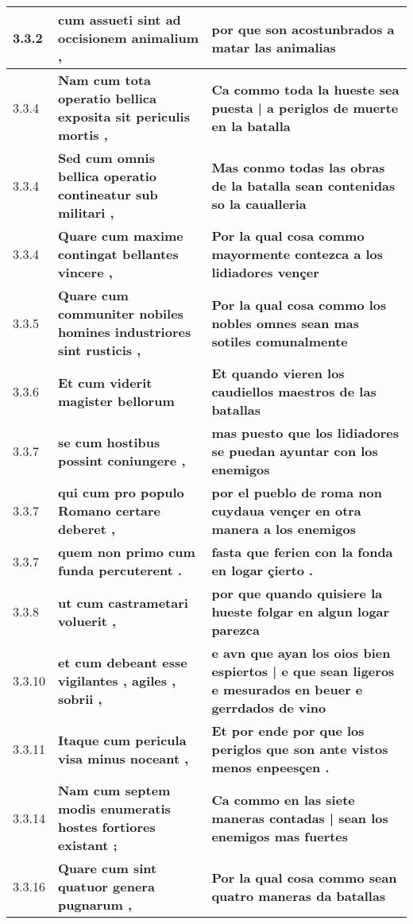 \begin{tabular}{|p{1cm}|p{6.5cm}|p{6.5cm}|}
3.3.2 &  \textbf{ cum assueti sint ad occisionem animalium , }  &  \textbf{ por que son acostunbrados a matar las animalias }  \\\hline
3.3.4 &  \textbf{ Nam cum tota operatio bellica exposita sit periculis mortis , }  &  \textbf{ Ca commo toda la hueste sea puesta | a periglos de muerte en la batalla }  \\\hline
3.3.4 &  \textbf{ Sed cum omnis bellica operatio contineatur sub militari , }  &  \textbf{ Mas conmo todas las obras de la batalla sean contenidas so la caualleria }  \\\hline
3.3.4 &  \textbf{ Quare cum maxime contingat bellantes vincere , }  &  \textbf{ Por la qual cosa commo mayormente contezca a los lidiadores vençer }  \\\hline
3.3.5 &  \textbf{ Quare cum communiter nobiles homines industriores sint rusticis , }  &  \textbf{ Por la qual cosa commo los nobles omnes sean mas sotiles comunalmente }  \\\hline
3.3.6 &  \textbf{ Et cum viderit magister bellorum }  &  \textbf{ Et quando vieren los caudiellos maestros de las batallas }  \\\hline
3.3.7 &  \textbf{ se cum hostibus possint coniungere , }  &  \textbf{ mas puesto que los lidiadores se puedan ayuntar con los enemigos }  \\\hline
3.3.7 &  \textbf{ qui cum pro populo Romano certare deberet , }  &  \textbf{ por el pueblo de roma non cuydaua vençer en otra manera a los enemigos }  \\\hline
3.3.7 &  \textbf{ quem non primo cum funda percuterent . }  &  \textbf{ fasta que ferien con la fonda en logar çierto . }  \\\hline
3.3.8 &  \textbf{ ut cum castrametari voluerit , }  &  \textbf{ por que quando quisiere la hueste folgar en algun logar parezca }  \\\hline
3.3.10 &  \textbf{ et cum debeant esse vigilantes , agiles , sobrii , }  &  \textbf{ e avn que ayan los oios bien espiertos | e que sean ligeros e mesurados en beuer e gerrdados de vino }  \\\hline
3.3.11 &  \textbf{ Itaque cum pericula visa minus noceant , }  &  \textbf{ Et por ende por que los periglos que son ante vistos menos enpeesçen . }  \\\hline
3.3.14 &  \textbf{ Nam cum septem modis enumeratis hostes fortiores existant ; }  &  \textbf{ Ca commo en las siete maneras contadas | sean los enemigos mas fuertes }  \\\hline
3.3.16 &  \textbf{ Quare cum sint quatuor genera pugnarum , }  &  \textbf{ Por la qual cosa commo sean quatro maneras da batallas }  \\\hline

\end{tabular}
